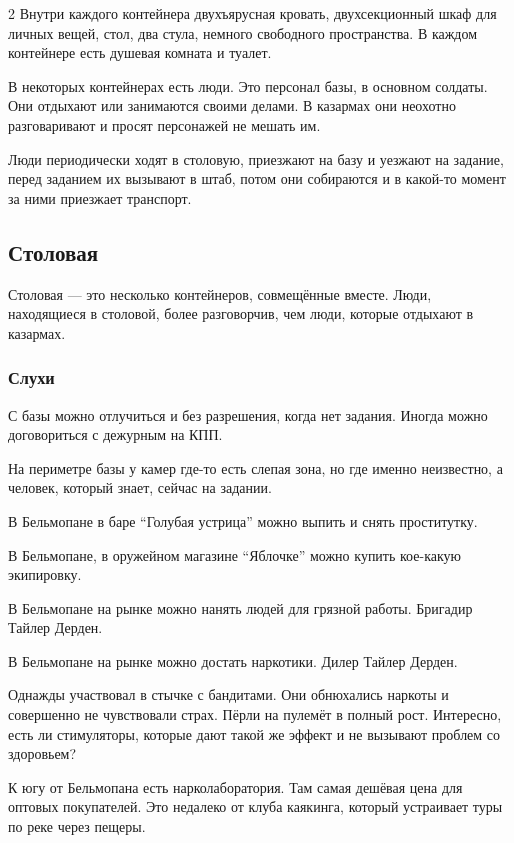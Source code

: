 \documentclass[twoside]{article}
\begin{document}
\begin{multicols}{2}
Внутри каждого контейнера двухъярусная кровать, двухсекционный шкаф для
личных вещей, стол, два стула, немного свободного пространства. В каждом
контейнере есть душевая комната и туалет.

В некоторых контейнерах есть люди. Это персонал базы, в основном
солдаты. Они отдыхают или занимаются своими делами. В казармах они
неохотно разговаривают и просят персонажей не мешать им.

Люди периодически ходят в столовую, приезжают на базу и уезжают на
задание, перед заданием их вызывают в штаб, потом они собираются и в
какой-то момент за ними приезжает транспорт.

\subsection{Столовая}\label{base-mess}

Столовая --- это несколько контейнеров, совмещённые вместе. Люди,
находящиеся в столовой, более разговорчив, чем люди, которые отдыхают в
казармах.

\subsubsection{Слухи}\label{rumors}

С базы можно отлучиться и без разрешения, когда нет задания. Иногда
можно договориться с дежурным на КПП.

На периметре базы у камер где-то есть слепая зона, но где именно
неизвестно, а человек, который знает, сейчас на задании.

В Бельмопане в баре \enquote{Голубая устрица} можно выпить и снять проститутку.

В Бельмопане, в оружейном магазине \enquote{Яблочке} можно купить кое-какую
экипировку.

В Бельмопане на рынке можно нанять людей для грязной работы. Бригадир
Тайлер Дерден.

В Бельмопане на рынке можно достать наркотики. Дилер Тайлер Дерден.

Однажды участвовал в стычке с бандитами. Они обнюхались наркоты и
совершенно не чувствовали страх. Пёрли на пулемёт в полный рост.
Интересно, есть ли стимуляторы, которые дают такой же эффект и не
вызывают проблем со здоровьем?

К югу от Бельмопана есть нарколаборатория. Там самая дешёвая цена для
оптовых покупателей. Это недалеко от клуба каякинга, который устраивает
туры по реке через пещеры.


\end{multicols}
\end{document}

